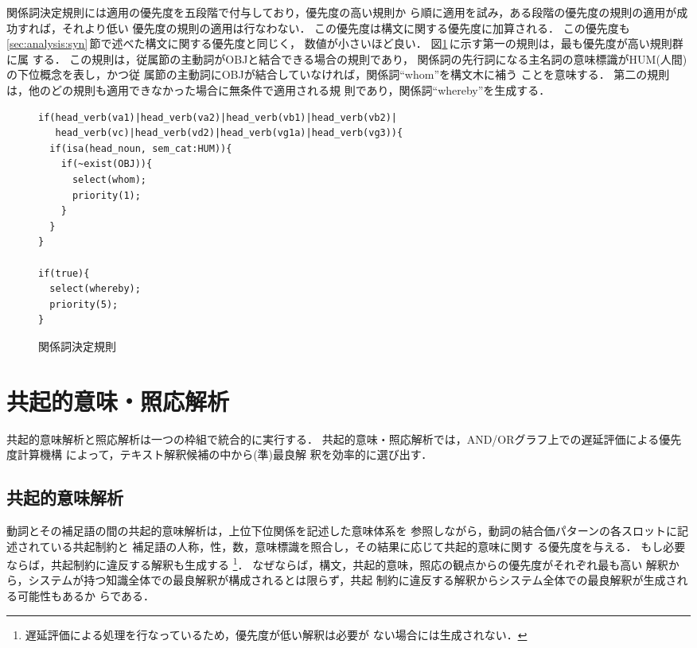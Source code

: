 関係詞決定規則には適用の優先度を五段階で付与しており，優先度の高い規則か
ら順に適用を試み，ある段階の優先度の規則の適用が成功すれば，それより低い
優先度の規則の適用は行なわない．
この優先度は構文に関する優先度に加算される．
この優先度も\ref{sec:analysis:syn}\,節で述べた構文に関する優先度と同じく，
数値が小さいほど良い．
図\ref{fig:rel_rule_ex}\,に示す第一の規則は，最も優先度が高い規則群に属
する．
この規則は，従属節の主動詞がOBJと結合できる場合の規則であり，
関係詞の先行詞になる主名詞の意味標識がHUM(人間)の下位概念を表し，かつ従
属節の主動詞にOBJが結合していなければ，関係詞``whom''を構文木に補う
ことを意味する．
第二の規則は，他のどの規則も適用できなかった場合に無条件で適用される規
則であり，関係詞``whereby''を生成する．
\begin{figure}[tbhp]
\begin{RULE}{0.9\textwidth}
\begin{verbatim}
if(head_verb(va1)|head_verb(va2)|head_verb(vb1)|head_verb(vb2)|
   head_verb(vc)|head_verb(vd2)|head_verb(vg1a)|head_verb(vg3)){
  if(isa(head_noun, sem_cat:HUM)){
    if(~exist(OBJ)){
      select(whom);
      priority(1);
    }
  }
}

if(true){
  select(whereby);
  priority(5);
}
\end{verbatim}
\end{RULE}
\caption{関係詞決定規則}
\label{fig:rel_rule_ex}
\end{figure}

\section{共起的意味・照応解析}
\label{sec:analysis:integ}

共起的意味解析と照応解析は一つの枠組で統合的に実行する．
共起的意味・照応解析では，AND/ORグラフ上での遅延評価による優先度計算機構
\cite{Tamura91c,Yoshimi97a}によって，テキスト解釈候補の中から(準)最良解
釈を効率的に選び出す．

\subsection{共起的意味解析}
\label{sec:analysis:integ:sem}

動詞とその補足語の間の共起的意味解析は，上位下位関係を記述した意味体系を
参照しながら，動詞の結合価パターンの各スロットに記述されている共起制約と
補足語の人称，性，数，意味標識を照合し，その結果に応じて共起的意味に関す
る優先度を与える．
もし必要ならば，共起制約に違反する解釈も生成する
\footnote{遅延評価による処理を行なっているため，優先度が低い解釈は必要が
ない場合には生成されない．}．
なぜならば，構文，共起的意味，照応の観点からの優先度がそれぞれ最も高い
解釈から，システムが持つ知識全体での最良解釈が構成されるとは限らず，共起
制約に違反する解釈からシステム全体での最良解釈が生成される可能性もあるか
らである．

